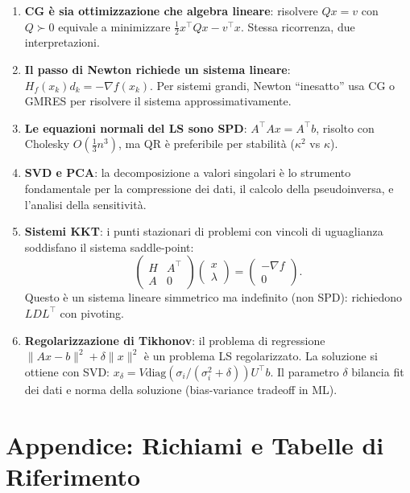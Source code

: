 \documentclass[11pt, a4paper, twoside]{book}
\theoremstyle{definition}
\theoremstyle{plain}
\theoremstyle{remark}
\begin{document}
\begin{enumerate}
  \item \textbf{CG è sia ottimizzazione che algebra lineare}: risolvere $Qx = v$ con $Q \succ 0$ equivale a minimizzare $\frac{1}{2}x^\top Qx - v^\top x$. Stessa ricorrenza, due interpretazioni.

  \item \textbf{Il passo di Newton richiede un sistema lineare}: $H_f(x_k)d_k = -\nabla f(x_k)$. Per sistemi grandi, Newton ``inesatto'' usa CG o GMRES per risolvere il sistema approssimativamente.

  \item \textbf{Le equazioni normali del LS sono SPD}: $A^\top Ax = A^\top b$, risolto con Cholesky $O(\frac{1}{3}n^3)$, ma QR è preferibile per stabilità ($\kappa^2$ vs $\kappa$).

  \item \textbf{SVD e PCA}: la decomposizione a valori singolari è lo strumento fondamentale per la compressione dei dati, il calcolo della pseudoinversa, e l'analisi della sensitività.

  \item \textbf{Sistemi KKT}: i punti stazionari di problemi con vincoli di uguaglianza soddisfano il sistema saddle-point:
  \[
    \begin{pmatrix} H & A^\top \\ A & 0 \end{pmatrix}
    \begin{pmatrix} x \\ \lambda \end{pmatrix}
    =
    \begin{pmatrix} -\nabla f \\ 0 \end{pmatrix}.
  \]
  Questo è un sistema lineare simmetrico ma indefinito (non SPD): richiedono $LDL^\top$ con pivoting.

  \item \textbf{Regolarizzazione di Tikhonov}: il problema di regressione $\|Ax - b\|^2 + \delta\|x\|^2$ è un problema LS regolarizzato. La soluzione si ottiene con SVD: $x_\delta = V \mathrm{diag}(\sigma_i/(\sigma_i^2+\delta)) U^\top b$. Il parametro $\delta$ bilancia fit dei dati e norma della soluzione (bias-variance tradeoff in ML).
\end{enumerate}

\appendix
\chapter{Appendice: Richiami e Tabelle di Riferimento}
\end{document}
